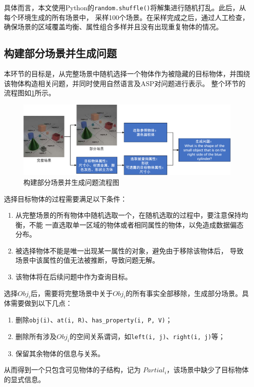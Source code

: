 \begin{enumerate}[nosep]
具体而言，本文使用Python的\texttt{random.shuffle()}将解集进行随机打乱。此后，从每个环境生成的所有场景中，
采样100个场景。在采样完成之后，通过人工检查，确保场景的区域覆盖均衡、属性组合多样并且没有出现重复物体的情况。
\end{enumerate}
\subsection{构建部分场景并生成问题}
本环节的目标是，从完整场景中随机选择一个物体作为被隐藏的目标物体，并围绕该物体构造相关问题，并同时使用自然语言及ASP对问题进行表示。
整个环节的流程图如\ref{generate-partial-scenes-and-questions}所示。
\begin{figure}[h]
\centering
\includegraphics[scale=0.6]{figures/部分场景及问题生成-crop.pdf}
\caption{构建部分场景并生成问题流程图}
\label{generate-partial-scenes-and-questions}
\end{figure}

选择目标物体的过程需要满足以下条件：
\begin{enumerate}[nosep]
\item 从完整场景的所有物体中随机选取一个，在随机选取的过程中，要注意保持均衡，不能
一直选取单一区域的物体或者相同属性的物体，以免造成数据偏态分布。
\item 被选择物体不能是唯一出现某一属性的对象，避免由于移除该物体后，
导致场景中该属性的值无法被推断，导致问题无解。
\item 该物体将在后续问题中作为查询目标。
\end{enumerate}

选择$Obj_i$后，需要将完整场景中关于$Obj_i$的所有事实全部移除，生成部分场景。具体需要做到以下几点：
\begin{enumerate}[nosep]
\item 删除\texttt{obj(i)}、\texttt{at(i, R)}、\texttt{has\_property(i, P, V)}；
\item 删除所有涉及$Obj_i$的空间关系谓词，如\texttt{left(i, j)}、\texttt{right(i, j)}等；
\item 保留其余物体的信息与关系。
\end{enumerate}
从而得到一个只包含可见物体的子结构，记为 $Partial_i$，该场景中缺少了目标物体的显式信息。

